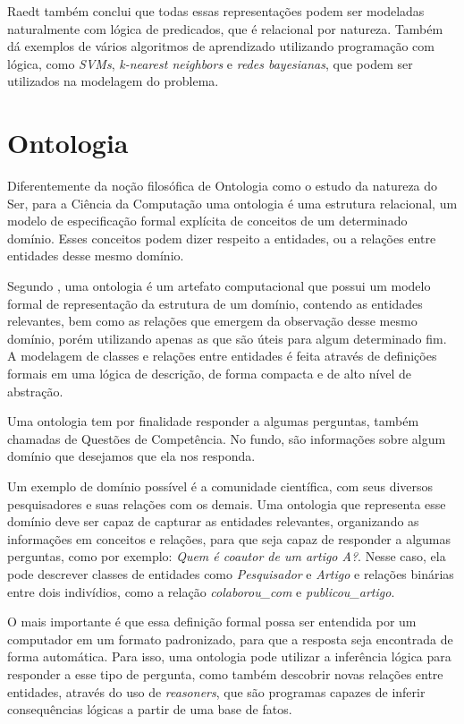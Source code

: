 Raedt também conclui que todas essas representações podem ser modeladas naturalmente com lógica de predicados, que é relacional por natureza. Também dá exemplos de vários algoritmos de aprendizado utilizando programação com lógica,
como \textit{SVMs}, \textit{k-nearest neighbors} e \textit{redes bayesianas}, que podem ser utilizados na modelagem do problema.

\section{Ontologia}
\label{sec:ontologia}

Diferentemente da noção filosófica de Ontologia como o estudo da natureza do Ser, para a Ciência da Computação uma ontologia é uma estrutura relacional, um modelo de especificação formal explícita de conceitos de um determinado domínio.
Esses conceitos podem dizer respeito a entidades, ou a relações entre entidades desse mesmo domínio.

Segundo \citet{Guarino2009}, uma ontologia é um artefato computacional que possui um modelo formal de representação da estrutura de um domínio, contendo as entidades relevantes, bem como as relações que emergem da observação desse mesmo domínio, porém utilizando apenas as que são úteis para algum determinado fim. A modelagem de classes e relações entre entidades é feita através de definições formais em uma lógica de descrição, de forma compacta e de alto nível de abstração.

Uma ontologia tem por finalidade responder a algumas perguntas, também chamadas de Questões de Competência. No fundo, são informações sobre algum domínio que desejamos que ela nos responda.

Um exemplo de domínio possível é a comunidade científica, com seus diversos pesquisadores e suas relações com os demais. Uma ontologia que representa esse domínio deve ser capaz de capturar as entidades relevantes, organizando as informações em conceitos e relações, para que seja capaz de responder a algumas perguntas, como por exemplo: \textit{Quem é coautor de um artigo A?}. Nesse caso, ela pode descrever classes de entidades como \textit{Pesquisador} e \textit{Artigo} e relações binárias entre dois indivídios, como a relação \textit{colaborou\_com} e \textit{publicou\_artigo}.

O mais importante é que essa definição formal possa ser entendida por um computador em um formato padronizado, para que a resposta seja encontrada de forma automática. Para isso, uma ontologia pode utilizar a inferência lógica para responder a esse tipo de pergunta, como também descobrir novas relações entre entidades, através do uso de \textit{reasoners}, que são programas capazes de inferir consequências lógicas a partir de uma base de fatos.

